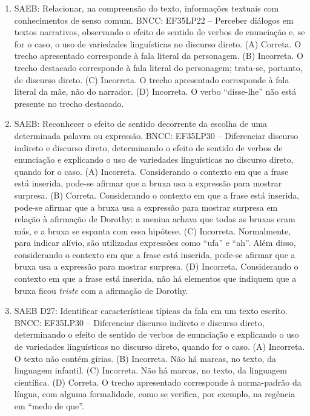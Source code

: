 \begin{enumerate}
\item
SAEB: Relacionar, na compreensão do texto, informações textuais com
conhecimentos de senso comum.
BNCC: EF35LP22 -- Perceber diálogos em textos narrativos, observando o
efeito de sentido de verbos de enunciação e, se for o caso, o uso de
variedades linguísticas no discurso direto.
(A) Correta. O trecho apresentado corresponde à fala literal da personagem.
(B) Incorreta. O trecho destacado corresponde à fala literal do personagem; 
trata-se, portanto, de discurso direto. 
(C) Incorreta. O trecho apresentado corresponde à fala literal da mãe, não do narrador.  
(D) Incorreta. O verbo ``disse-lhe'' não está presente no trecho destacado.

\item
SAEB: Reconhecer o efeito
de sentido decorrente da escolha de uma determinada palavra ou
expressão.
BNCC: EF35LP30 -- Diferenciar discurso indireto e discurso direto,
determinando o efeito de sentido de verbos de enunciação e explicando o
uso de variedades linguísticas no discurso direto, quando for o caso.
(A) Incorreta. Considerando o contexto em que a frase está inserida, 
pode-se afirmar que a bruxa usa a expressão para mostrar surpresa.
(B) Correta. Considerando o contexto em que a frase está inserida, 
pode-se afirmar que a bruxa usa a expressão para mostrar surpresa em 
relação à afirmação de Dorothy: a menina achava que todas as bruxas eram
más, e a bruxa se espanta com essa hipótese.
(C)  Incorreta. Normalmente, para indicar alívio, são utilizadas
expressões como ``ufa'' e ``ah''. Além disso, considerando o contexto em
que a frase está inserida, pode-se afirmar que a bruxa usa a expressão 
para mostrar surpresa.
(D)  Incorreta. Considerando o contexto em que a frase está inserida, 
não há elementos que indiquem que a bruxa ficou \textit{triste} com a 
afirmação de Dorothy.

\item
SAEB D27: Identificar características típicas da fala em um texto
escrito.
BNCC: EF35LP30 -- Diferenciar discurso indireto e discurso direto,
determinando o efeito de sentido de verbos de enunciação e explicando o
uso de variedades linguísticas no discurso direto, quando for o caso.
(A)  Incorreta. O texto não contém gírias.
(B)  Incorreta. Não há marcas, no texto, da linguagem infantil.
(C)  Incorreta. Não há marcas, no texto, da linguagem científica.
(D)  Correta. O trecho apresentado corresponde à norma-padrão da língua, 
com alguma formalidade, como se verifica, por exemplo, na regência em
``medo de que''.
\end{enumerate}

